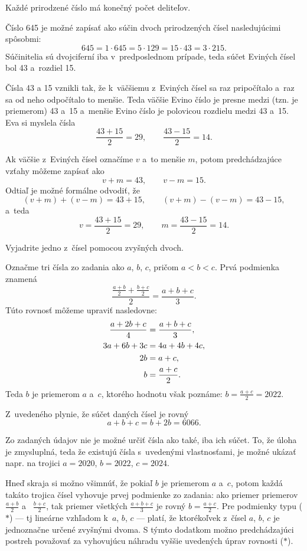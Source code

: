 {%
\napad
Každé prirodzené číslo má konečný počet deliteľov.

\riesenie
Číslo 645 je možné zapísať ako súčin dvoch prirodzených čísel nasledujúcimi spôsobmi:
$$
645 =1\cdot645 =5\cdot129 =15\cdot43 = 3\cdot215.
$$
Súčinitelia sú dvojciferní iba v~predposlednom prípade, teda súčet Eviných čísel bol 43 a~rozdiel 15.

Čísla 43 a 15 vznikli tak, že k~väčšiemu z~Eviných čísel sa raz pripočítalo a~raz sa od neho odpočítalo to menšie.
Teda väčšie Evino číslo je presne medzi (tzn. je priemerom) 43 a~15 a~menšie Evino číslo je polovicou rozdielu medzi 43 a~15.
Eva si myslela čísla
$$
\frac{43+15}{2}=29, \qquad \frac{43-15}{2}=14.
$$

\poznamka
Ak väčšie z~Eviných čísel označíme $v$ a~to menšie $m$, potom predchádzajúce vzťahy môžeme zapísať ako
$$
v+m=43, \qquad v-m=15.
$$
Odtiaľ je možné formálne odvodiť, že
$$
(v+m)+(v-m) =43+15, \qquad
(v+m)-(v-m) =43-15,
$$
a~teda
$$
v =\frac{43+15}{2} =29, \qquad
m =\frac{43-15}{2} =14.
$$}

{%
\napad
Vyjadrite jedno z~čísel pomocou zvyšných dvoch.

\res
Označme tri čísla zo zadania ako $a$, $b$, $c$, pričom $a<b<c$.
Prvá podmienka znamená
$$
\frac{\frac{a+b}{2}+\frac{b+c}{2}}{2}=\frac{a+b+c}{3}. \tag{$*$}
$$
Túto rovnosť môžeme upraviť nasledovne:
$$\aligned
\frac{a+2b+c}{4} &=\frac{a+b+c}{3}, \\
3a+6b+3c &= 4a+4b+4c, \\
2b &= a+c, \\
b &= \frac{a+c}{2}.
\endaligned
$$
Teda $b$ je priemerom $a$ a~$c$, ktorého hodnotu však poznáme:
$b =\frac{a+c}{2} = 2022$.

Z~uvedeného plynie, že súčet daných čísel je rovný
$$
a+b+c =b+2b =6066.
$$

\poznamky
Zo zadaných údajov nie je možné určiť čísla ako také, iba ich súčet.
To, že úloha je zmysluplná, teda že existujú čísla s~uvedenými vlastnosťami, je možné ukázať napr. na trojici $a=2020$, $b=2022$, $c=2024$.

Hneď skraja si možno všimnúť, že pokiaľ $b$ je priemerom $a$ a~$c$, potom každá takáto trojica čísel vyhovuje prvej podmienke zo zadania: ako priemer priemerov $\frac{a+b}{2}$ a~ $\frac{b+c}{2}$, tak priemer všetkých $\frac{a+b+c}{3}$ je rovný $b=\frac{a+c}{2}$.
Pre podmienky typu ($*$) --- tj lineárne vzhľadom k~$a$, $b$, $c$ --- platí, že ktorékoľvek z~čísel $a$, $b$, $c$ je jednoznačne určené zvyšnými dvoma.
S týmto dodatkom možno predchádzajúci postreh považovať za vyhovujúcu náhradu vyššie uvedených úprav rovnosti ($*$).}

